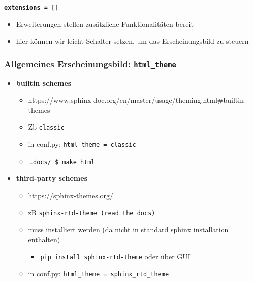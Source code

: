 \textbf{\texttt{extensions\ =\ {[}{]}}}

\begin{itemize}
\tightlist
\item
  Erweiterungen stellen zusätzliche Funktionalitäten bereit
\item
  hier können wir leicht Schalter setzen, um das Erscheinungsbild zu
  steuern
\end{itemize}

\hypertarget{allgemeines-erscheinungsbild-html_theme}{%
\subsubsection{\texorpdfstring{\textbf{Allgemeines Erscheinungsbild:
\texttt{html\_theme}}}{Allgemeines Erscheinungsbild: html\_theme}}\label{allgemeines-erscheinungsbild-html_theme}}

\begin{itemize}
\tightlist
\item
  \textbf{builtin schemes}

  \begin{itemize}
  \tightlist
  \item
    https://www.sphinx-doc.org/en/master/usage/theming.html\#builtin-themes
  \item
    Zb \texttt{classic}
  \item
    in conf.py:
    \texttt{html\_theme\ =\ \textquotesingle{}classic\textquotesingle{}}
  \item
    \ldots{}\texttt{docs/\ \$\ make\ html}
  \end{itemize}
\item
  \textbf{third-party schemes}

  \begin{itemize}
  \tightlist
  \item
    https://sphinx-themes.org/
  \item
    zB \texttt{sphinx-rtd-theme\ (read\ the\ docs)}
  \item
    muss installiert werden (da nicht in standard sphinx installation
    enthalten)

    \begin{itemize}
    \tightlist
    \item
      \texttt{pip\ install\ sphinx-rtd-theme} oder über GUI
    \end{itemize}
  \item
    in conf.py:
    \texttt{html\_theme\ =\ \textquotesingle{}sphinx\_rtd\_theme\textquotesingle{}}
  \end{itemize}
\end{itemize}

